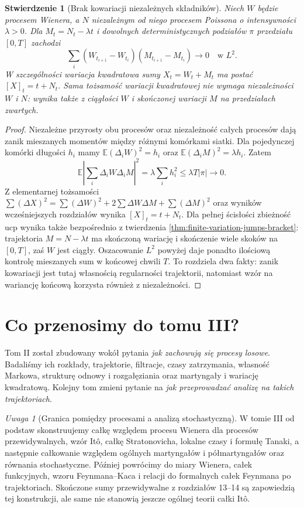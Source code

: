 \documentclass[11pt,a4paper,oneside]{report}
\numberwithin{equation}{chapter}
\theoremstyle{plain}
\newtheorem{stwierdzenie}[twierdzenie]{Stwierdzenie}
\theoremstyle{definition}
\theoremstyle{remark}
\newtheorem{uwaga}{Uwaga}[chapter]
\newcommand{\E}{\mathbb{E}}
\begin{document}
\begin{stwierdzenie}[Brak kowariacji niezależnych składników]
Niech $W$ będzie procesem Wienera, a $N$ niezależnym
od niego procesem Poissona o intensywności $\lambda>0$.
Dla $M_t=N_t-\lambda t$ i dowolnych deterministycznych
podziałów $\pi$ przedziału $[0,T]$ zachodzi
\[
\sum_i(W_{t_{i+1}}-W_{t_i})
(M_{t_{i+1}}-M_{t_i})\longrightarrow0
\quad\text{w }L^2.
\]
W szczególności wariacja kwadratowa sumy
$X_t=W_t+M_t$ ma postać $[X]_t=t+N_t$.
Sama tożsamość wariacji kwadratowej nie wymaga
niezależności $W$ i $N$: wynika także z ciągłości $W$
i skończonej wariacji $M$ na przedziałach zwartych.
\end{stwierdzenie}
\begin{proof}
Niezależne przyrosty obu procesów oraz niezależność
całych procesów dają zanik mieszanych momentów
między różnymi komórkami siatki. Dla pojedynczej komórki
długości $h_i$ mamy
$\E(\Delta_iW)^2=h_i$ oraz
$\E(\Delta_iM)^2=\lambda h_i$.
Zatem
\[
\E\left|\sum_i\Delta_iW\Delta_iM\right|^2
=\lambda\sum_i h_i^2\le\lambda T|\pi|\longrightarrow0.
\]
Z elementarnej tożsamości
$\sum(\Delta X)^2=\sum(\Delta W)^2+
2\sum\Delta W\Delta M+\sum(\Delta M)^2$
oraz wyników wcześniejszych rozdziałów wynika
$[X]_t=t+N_t$. Dla pełnej ścisłości zbieżność ucp
wynika także bezpośrednio z twierdzenia
\ref{thm:finite-variation-jumps-bracket}: trajektoria
$M=N-\lambda t$ ma skończoną wariację i skończenie
wiele skoków na $[0,T]$, zaś $W$ jest ciągły.
Oszacowanie $L^2$ powyżej daje ponadto ilościową kontrolę
mieszanych sum w końcowej chwili $T$.
To rozdziela dwa fakty: zanik kowariacji jest tutaj
własnością regularności trajektorii, natomiast wzór
na wariancję końcową korzysta również z niezależności.
\end{proof}

\section{Co przenosimy do tomu III?}
Tom II został zbudowany wokół pytania \emph{jak zachowują
się procesy losowe}. Badaliśmy ich rozkłady, trajektorie,
filtracje, czasy zatrzymania, własność Markowa, strukturę
odnowy i rozgałęziania oraz martyngały i wariację
kwadratową. Kolejny tom zmieni pytanie na
\emph{jak przeprowadzać analizę na takich trajektoriach}.

\begin{uwaga}[Granica pomiędzy procesami a analizą stochastyczną]
W tomie III od podstaw skonstruujemy całkę względem
procesu Wienera dla procesów przewidywalnych, wzór
Itô, całkę Stratonovicha, lokalne czasy i formułę
Tanaki, a następnie całkowanie względem ogólnych
martyngałów i półmartyngałów oraz równania stochastyczne.
Później powrócimy do miary Wienera, całek funkcyjnych,
wzoru Feynmana--Kaca i relacji do formalnych całek
Feynmana po trajektoriach. Skończone sumy przewidywalne
z rozdziałów 13--14 są zapowiedzią tej konstrukcji,
ale same nie stanowią jeszcze ogólnej teorii całki Itô.
\end{uwaga}
\end{document}
